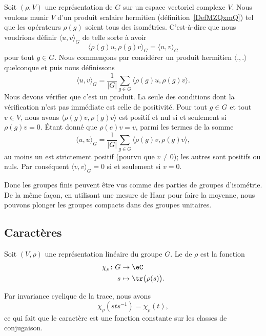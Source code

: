 Soit \( (\rho,V)\) une représentation de \( G\) sur un espace vectoriel complexe \( V\). Nous voulons munir \( V\) d'un produit scalaire hermitien (définition~\ref{DefMZQxmQ}) tel que les opérateurs \( \rho(g)\) soient tous des isométries. C'est-à-dire que nous voudrions définir \( \langle u, v\rangle_G\) de telle sorte à avoir
\begin{equation}
    \langle \rho(g)u, \rho(g)v\rangle_G =\langle u, v\rangle_G
\end{equation}
pour tout \( g\in G\). Nous commençons par considérer un produit hermitien \( \langle ., .\rangle \) quelconque et puis nous définissons
\begin{equation}
    \langle u, v\rangle_G=\frac{1}{ | G | }\sum_{g\in G}\langle \rho(g)u, \rho(g)v\rangle.
\end{equation}
Nous devons vérifier que c'est un produit. La seule des conditions dont la vérification n'est pas immédiate est celle de positivité. Pour tout \( g\in G\) et tout \( v\in V\), nous avons \( \langle \rho(g)v, \rho(g)v\rangle \) est positif et nul si et seulement si \( \rho(g)v=0\). Étant donné que \( \rho(e)v=v\), parmi les termes de la somme
\begin{equation}
    \langle u, u\rangle_G=\frac{1}{ | G | }\sum_{g\in G}\langle \rho(g)v, \rho(g)v\rangle,
\end{equation}
au moins un est strictement positif (pourvu que \( v\neq 0\)); les autres sont positifs ou nuls. Par conséquent \( \langle v, v\rangle_G=0\) si et seulement si \( v=0\).

Donc les groupes finis peuvent être vus comme des parties de groupes d'isométrie. De la même façon, en utilisant une mesure de Haar pour faire la moyenne, nous pouvons plonger les groupes compacts dans des groupes unitaires.

\subsection{Caractères}

\begin{definition}
    Soit \( (V,\rho)\) une représentation linéaire du groupe \( G\). Le  de \( \rho\) est la fonction
    \begin{equation}
        \begin{aligned}
            \chi_{\rho}\colon G&\to \eC \\
            s&\mapsto \tr\big( \rho(s) \big).
        \end{aligned}
    \end{equation}
\end{definition}
Par invariance cyclique de la trace, nous avons
\begin{equation}
    \chi_{\rho}(sts^{-1})=\chi_{\rho}(t),
\end{equation}
ce qui fait que le caractère est une fonction constante sur les classes de conjugaison.


